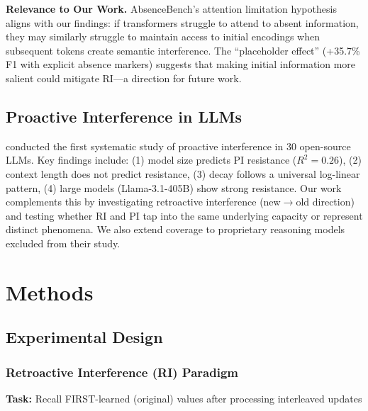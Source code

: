 \documentclass{article}
\begin{document}
\textbf{Relevance to Our Work.} AbsenceBench's attention limitation hypothesis aligns with our findings: if transformers struggle to attend to absent information, they may similarly struggle to maintain access to initial encodings when subsequent tokens create semantic interference. The ``placeholder effect'' (+35.7\% F1 with explicit absence markers) suggests that making initial information more salient could mitigate RI---a direction for future work.

\subsection{Proactive Interference in LLMs}

\citet{liu2024unable} conducted the first systematic study of proactive interference in 30 open-source LLMs. Key findings include: (1) model size predicts PI resistance ($R^2 = 0.26$), (2) context length does not predict resistance, (3) decay follows a universal log-linear pattern, (4) large models (Llama-3.1-405B) show strong resistance. Our work complements this by investigating retroactive interference (new$\rightarrow$old direction) and testing whether RI and PI tap into the same underlying capacity or represent distinct phenomena. We also extend coverage to proprietary reasoning models excluded from their study.

\section{Methods}
\label{sec:methods}

\subsection{Experimental Design}

\subsubsection{Retroactive Interference (RI) Paradigm}

\textbf{Task:} Recall FIRST-learned (original) values after processing interleaved updates
\end{document}
